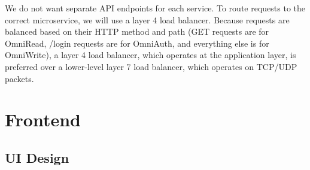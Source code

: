 We do not want separate API endpoints for each service. To route requests to the correct microservice, we will use a layer 4 load balancer. Because requests are balanced based on their HTTP method and path (GET requests are for OmniRead, /login requests are for OmniAuth, and everything else is for OmniWrite), a layer 4 load balancer, which operates at the application layer, is preferred over a lower-level layer 7 load balancer, which operates on TCP/UDP packets.

\section{Frontend}
\label{sec:design-system-frontend}

\subsection{UI Design}
\label{sec:design-ui}
